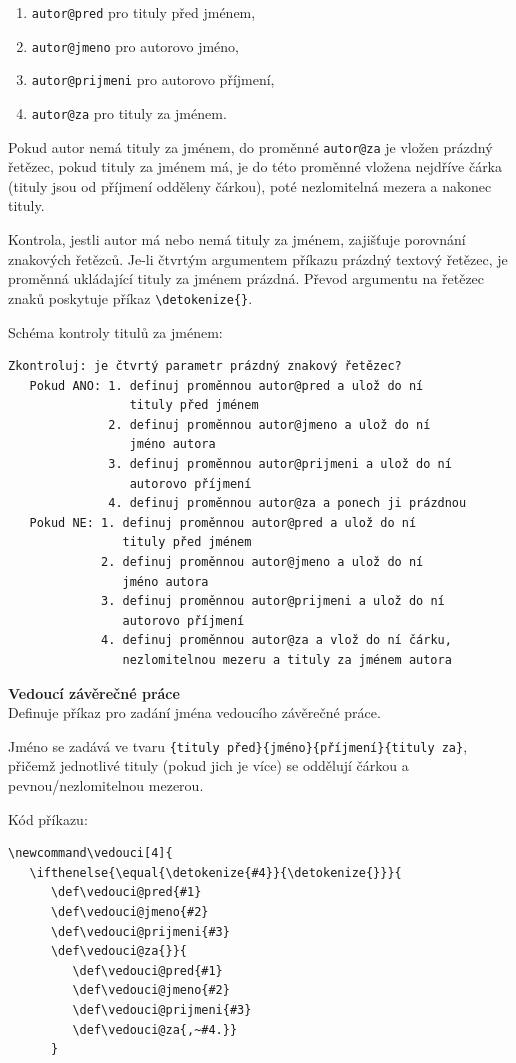 \begin{enumerate}
	\item \verb|autor@pred| pro tituly před jménem,
	\item \verb|autor@jmeno| pro autorovo jméno,
	\item \verb|autor@prijmeni| pro autorovo příjmení,
	\item \verb|autor@za| pro tituly za jménem.
\end{enumerate}

Pokud autor nemá tituly za jménem, do proměnné \verb|autor@za| je vložen prázdný řetězec, pokud tituly za jménem má, je do této proměnné vložena nejdříve čárka (tituly jsou od příjmení odděleny čárkou), poté nezlomitelná mezera a nakonec tituly.

Kontrola, jestli autor má nebo nemá tituly za jménem, zajišťuje porovnání znakových řetězců. Je-li čtvrtým argumentem příkazu prázdný textový řetězec, je proměnná ukládající tituly za jménem prázdná. Převod argumentu na řetězec znaků poskytuje příkaz \verb|\detokenize{}|.

Schéma kontroly titulů za jménem:

\begin{verbatim}
Zkontroluj: je čtvrtý parametr prázdný znakový řetězec?
   Pokud ANO: 1. definuj proměnnou autor@pred a ulož do ní
                 tituly před jménem
              2. definuj proměnnou autor@jmeno a ulož do ní
                 jméno autora
              3. definuj proměnnou autor@prijmeni a ulož do ní
                 autorovo příjmení
              4. definuj proměnnou autor@za a ponech ji prázdnou
   Pokud NE: 1. definuj proměnnou autor@pred a ulož do ní
                tituly před jménem
             2. definuj proměnnou autor@jmeno a ulož do ní
                jméno autora
             3. definuj proměnnou autor@prijmeni a ulož do ní
                autorovo příjmení
             4. definuj proměnnou autor@za a vlož do ní čárku,
                nezlomitelnou mezeru a tituly za jménem autora
\end{verbatim}

\newpage
\textbf{Vedoucí závěrečné práce}\\
Definuje příkaz pro zadání jména vedoucího závěrečné práce.

Jméno se zadává ve tvaru \verb|{tituly před}{jméno}{příjmení}{tituly za}|, přičemž jednotlivé tituly (pokud jich je více) se oddělují čárkou a pevnou/nezlomitelnou mezerou.

Kód příkazu:

\begin{verbatim}
\newcommand\vedouci[4]{
   \ifthenelse{\equal{\detokenize{#4}}{\detokenize{}}}{
      \def\vedouci@pred{#1}
      \def\vedouci@jmeno{#2}
      \def\vedouci@prijmeni{#3}
      \def\vedouci@za{}}{
         \def\vedouci@pred{#1}
         \def\vedouci@jmeno{#2}
         \def\vedouci@prijmeni{#3}
         \def\vedouci@za{,~#4.}}
      }
\end{verbatim}

